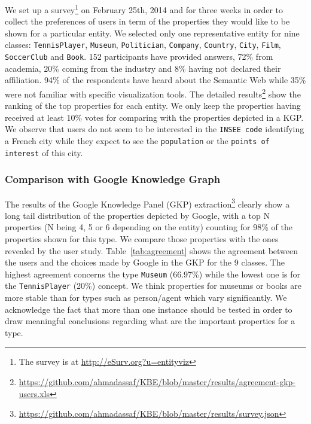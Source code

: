 We set up a survey\footnote{The survey is at \url{http://eSurv.org?u=entityviz}} on February 25th, 2014 and for three weeks in order to collect the preferences of users in term of the properties they would like to be shown for a particular entity. We selected only one representative entity for nine classes: \texttt{TennisPlayer}, \texttt{Museum}, \texttt{Politician}, \texttt{Company}, \texttt{Country}, \texttt{City}, \texttt{Film}, \texttt{SoccerClub} and \texttt{Book}. 152 participants have provided answers, 72\% from academia, 20\% coming from the industry and 8\% having not declared their affiliation. 94\% of the respondents have heard about the Semantic Web while 35\% were not familiar with specific visualization tools. The detailed results\footnote{\url{https://github.com/ahmadassaf/KBE/blob/master/results/agreement-gkp-users.xls}} show the ranking of the top properties for each entity. We only keep the properties having received at least 10\% votes for comparing with the properties depicted in a KGP. We observe that users do not seem to be interested in the \texttt{INSEE code} identifying a French city while they expect to see the \texttt{population} or the \texttt{points of interest} of this city.

\subsubsection{Comparison with Google Knowledge Graph}

The results of the Google Knowledge Panel (GKP) extraction\footnote{\url{https://github.com/ahmadassaf/KBE/blob/master/results/survey.json}} clearly show a long tail distribution of the properties depicted by Google, with a top N properties (N being 4, 5 or 6 depending on the entity) counting for 98\% of the properties shown for this type. We compare those properties with the ones revealed by the user study. Table~\ref{tab:agreement} shows the agreement between the users and the choices made by Google in the GKP for the 9 classes. The highest agreement concerns the type \texttt{Museum} (66.97\%) while the lowest one is for the \texttt{TennisPlayer} (20\%) concept. We think properties for museums or books are more stable than for types such as person/agent which vary significantly. We acknowledge the fact that more than one instance should be tested in order to draw meaningful conclusions regarding what are the important properties for a type.

\begin{table}[!htp]
\end{table}\normalsize

